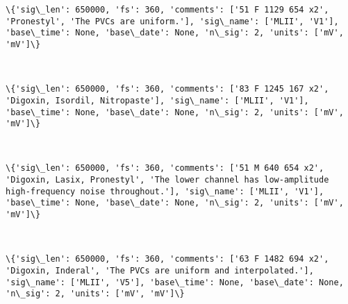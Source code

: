 \documentclass[11pt]{article}
\begin{document}
    \begin{Verbatim}[commandchars=\\\{\}]
\{'sig\_len': 650000, 'fs': 360, 'comments': ['51 F 1129 654 x2', 'Pronestyl', 'The PVCs are uniform.'], 'sig\_name': ['MLII', 'V1'], 'base\_time': None, 'base\_date': None, 'n\_sig': 2, 'units': ['mV', 'mV']\}

    \end{Verbatim}

    \begin{center}
    \end{center}
    { \hspace*{\fill} \\}
    
    \begin{Verbatim}[commandchars=\\\{\}]
\{'sig\_len': 650000, 'fs': 360, 'comments': ['83 F 1245 167 x2', 'Digoxin, Isordil, Nitropaste'], 'sig\_name': ['MLII', 'V1'], 'base\_time': None, 'base\_date': None, 'n\_sig': 2, 'units': ['mV', 'mV']\}

    \end{Verbatim}

    \begin{center}
    \end{center}
    { \hspace*{\fill} \\}
    
    \begin{Verbatim}[commandchars=\\\{\}]
\{'sig\_len': 650000, 'fs': 360, 'comments': ['51 M 640 654 x2', 'Digoxin, Lasix, Pronestyl', 'The lower channel has low-amplitude high-frequency noise throughout.'], 'sig\_name': ['MLII', 'V1'], 'base\_time': None, 'base\_date': None, 'n\_sig': 2, 'units': ['mV', 'mV']\}

    \end{Verbatim}

    \begin{center}
    \end{center}
    { \hspace*{\fill} \\}
    
    \begin{Verbatim}[commandchars=\\\{\}]
\{'sig\_len': 650000, 'fs': 360, 'comments': ['63 F 1482 694 x2', 'Digoxin, Inderal', 'The PVCs are uniform and interpolated.'], 'sig\_name': ['MLII', 'V5'], 'base\_time': None, 'base\_date': None, 'n\_sig': 2, 'units': ['mV', 'mV']\}

    \end{Verbatim}
\end{document}
